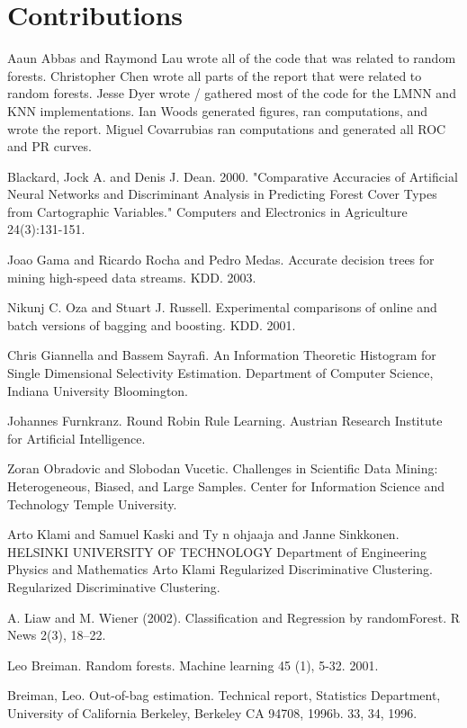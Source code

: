 \documentclass[11pt]{article}
\begin{document}
\section{Contributions}
Aaun Abbas and Raymond Lau wrote all of the code that was related to random forests. Christopher Chen wrote all parts of the report that were related to random forests. Jesse Dyer wrote / gathered most of the code for the LMNN and KNN implementations. Ian Woods generated figures, ran computations, and wrote the report. Miguel Covarrubias ran computations and generated all ROC and PR curves.

\pagebreak
\begin{thebibliography}{}
Blackard, Jock A. and Denis J. Dean. 2000. "Comparative Accuracies of Artificial Neural Networks and Discriminant Analysis in Predicting Forest Cover Types from Cartographic Variables." Computers and Electronics in Agriculture 24(3):131-151.

Joao Gama and Ricardo Rocha and Pedro Medas. Accurate decision trees for mining high-speed data streams. KDD. 2003.

Nikunj C. Oza and Stuart J. Russell. Experimental comparisons of online and batch versions of bagging and boosting. KDD. 2001.

Chris Giannella and Bassem Sayrafi. An Information Theoretic Histogram for Single Dimensional Selectivity Estimation. Department of Computer Science, Indiana University Bloomington.

Johannes Furnkranz. Round Robin Rule Learning. Austrian Research Institute for Artificial Intelligence.

Zoran Obradovic and Slobodan Vucetic. Challenges in Scientific Data Mining: Heterogeneous, Biased, and Large Samples. Center for Information Science and Technology Temple University.

Arto Klami and Samuel Kaski and Ty n ohjaaja and Janne Sinkkonen. HELSINKI UNIVERSITY OF TECHNOLOGY Department of Engineering Physics and Mathematics Arto Klami Regularized Discriminative Clustering. Regularized Discriminative Clustering.

A. Liaw and M. Wiener (2002). Classification and Regression by randomForest. R News 2(3), 18--22.

Leo Breiman. Random forests. Machine learning 45 (1), 5-32. 2001.

Breiman, Leo. Out-of-bag estimation. Technical report, Statistics Department, University of California Berkeley, Berkeley CA 94708, 1996b. 33, 34, 1996.


\end{thebibliography}
\end{document}
